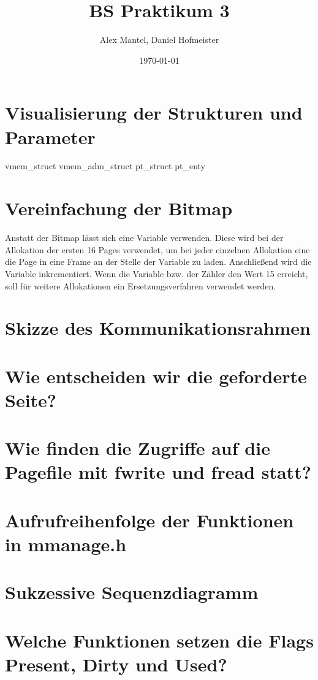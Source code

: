 \documentclass[pdftex,10pt,a4paper]{article}
\begin{document}
\title{BS Praktikum 3}
\author{Alex Mantel, Daniel Hofmeister}
\date{\today}
\maketitle
\newpage

\tableofcontents
\newpage

\section{Visualisierung der Strukturen und Parameter}
        
vmem\_struct
  vmem\_adm\_struct
  pt\_struct
    pt\_enty

\section{Vereinfachung der Bitmap}
Anstatt der Bitmap l\"asst sich eine Variable verwenden. Diese wird bei der Allokation der ersten 16 Pages verwendet, um bei jeder einzelnen Allokation eine die Page in eine Frame an der Stelle der Variable zu laden. Anschlie{\ss}end wird die Variable inkrementiert. Wenn die Variable bzw. der Z\"ahler den Wert 15 erreicht, soll f\"ur weitere Allokationen ein Ersetzungsverfahren verwendet werden.

\section{Skizze des Kommunikationsrahmen}


\section{Wie entscheiden wir die geforderte Seite?}

\section{Wie finden die Zugriffe auf die Pagefile mit fwrite und fread statt?}

\section{Aufrufreihenfolge der Funktionen in mmanage.h}

\section{Sukzessive Sequenzdiagramm}

\section{Welche Funktionen setzen die Flags Present, Dirty und Used?}



\end{document}
